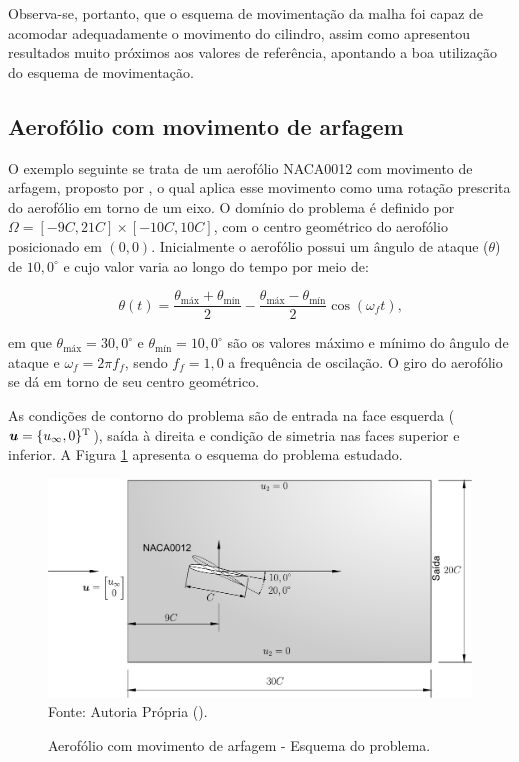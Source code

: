 Observa-se, portanto, que o esquema de movimentação da malha foi capaz de acomodar adequadamente o movimento do cilindro, assim como apresentou resultados muito próximos aos valores de referência, apontando a boa utilização do esquema de movimentação.

\subsection{Aerofólio com movimento de arfagem}

O exemplo seguinte se trata de um aerofólio NACA0012 com movimento de arfagem, proposto por , o qual aplica esse movimento como uma rotação prescrita do aerofólio em torno de um eixo. O domínio do problema é definido por $\Omega=[-9C, 21C]\times[-10C, 10C]$, com o centro geométrico do aerofólio posicionado em $(0,0)$. Inicialmente o aerofólio possui um ângulo de ataque ($\theta$) de $10,0^\circ$ e cujo valor varia ao longo do tempo por meio de:

\begin{equation}
    \theta(t)=\frac{\theta_\mathrm{máx}+\theta_\mathrm{mín}}{2}-\frac{\theta_\mathrm{máx}-\theta_\mathrm{mín}}{2}\cos{(\omega_f t)}\text{,}
\end{equation}

\noindent em que $\theta_\mathrm{máx}=30,0^\circ$ e $\theta_\mathrm{mín}=10,0^\circ$ são os valores máximo e mínimo do ângulo de ataque e $\omega_f=2\pi f_f$, sendo $f_f=1,0$ a frequência de oscilação. O giro do aerofólio se dá em torno de seu centro geométrico.

As condições de contorno do problema são de entrada na face esquerda ($\boldsymbol{u}=\{u_\infty,0\}^\mathrm{T}$), saída à direita e condição de simetria nas faces superior e inferior. A Figura \ref{fig:rotating-airfoil} apresenta o esquema do problema estudado.

\begin{figure}[h!]
    \centering
    \caption{Aerofólio com movimento de arfagem - Esquema do problema.}
    \includegraphics[width=.8\linewidth]{Figuras/rotating-airfoil/rotating-airfoil.pdf}
    \\Fonte: Autoria Própria (\the\year).
    \label{fig:rotating-airfoil}
\end{figure}

